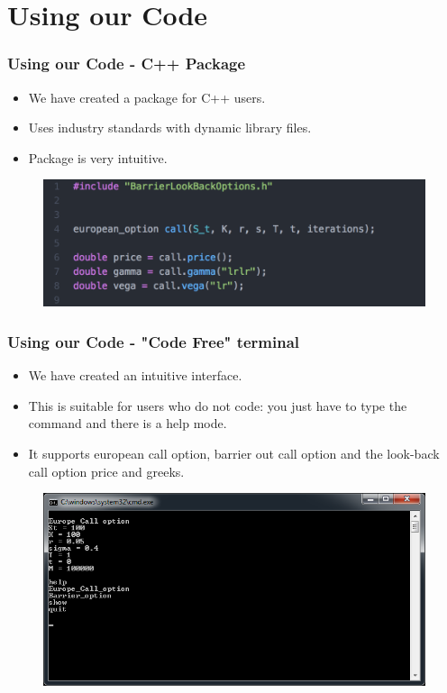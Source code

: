 \documentclass[12pt]{beamer}
\begin{document}
\section{Using our Code}
\frame{\tableofcontents[currentsection]}
\begin{frame}
\frametitle{Using our Code - C++ Package}
\begin{itemize}
  \item We have created a package for C++ users.
  \item Uses industry standards with dynamic library files.
  \item Package is very intuitive.
\end{itemize}

\begin{figure}[h!]
  \centering
\includegraphics[width=\textwidth]{graphs/code_easy_demo.png}
\end{figure}
\end{frame}


\begin{frame}
\frametitle{Using our Code - "Code Free" terminal}
\begin{itemize}
  \item We have created an intuitive interface.
  \item This is suitable for users who do not code: you just have to type the command and there is a help mode.
  \item It supports european call option, barrier out call option and the look-back call option price and greeks.
\end{itemize}
\begin{figure}[h!]
  \centering
\includegraphics[width=.8\textwidth]{graphs/interface_demo.png}
\end{figure}
\end{frame}
\end{document}
